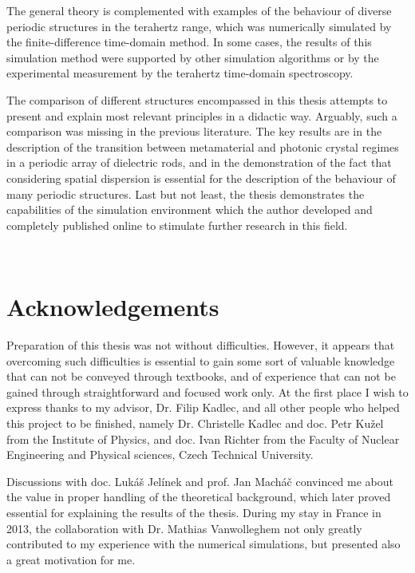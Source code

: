 The general theory is complemented with examples of the behaviour of diverse periodic structures in the terahertz range, which was numerically simulated by the finite-difference time-domain method. In some cases, the results of this simulation method were supported by other simulation algorithms or by the experimental measurement by the terahertz time-domain spectroscopy. 

The comparison of different structures encompassed in this thesis attempts to present and explain most relevant principles in a didactic way. Arguably, such a comparison was missing in the previous literature.
The key results are in the description of the transition between metamaterial and photonic crystal regimes in a periodic array of dielectric rods, and in the demonstration of the fact that considering spatial dispersion is essential for the description of the behaviour of many periodic structures.
Last but not least, the thesis demonstrates the capabilities of the simulation environment which the author developed and completely published online to stimulate further research in this field. 



\thispagestyle{empty} \newpage ~ \thispagestyle{empty} \newpage \setcounter{page}{1}

{\let\clearpage\relax\chapter*{Acknowledgements}}
Preparation of this thesis was not without difficulties. However, it appears that overcoming such difficulties is essential to gain some sort of valuable knowledge that can not be conveyed through textbooks, and of experience that can not be gained through straightforward and focused work only.  At the first place I wish to express thanks to my advisor, Dr. Filip Kadlec, and all other people who helped this project to be finished, namely Dr. Christelle Kadlec and doc. Petr Ku\v{z}el  from the Institute of Physics, and doc. Ivan Richter from the Faculty of Nuclear Engineering and Physical sciences, Czech Technical University. 

Discussions with doc. Lukáš Jelínek and prof. Jan Macháč convinced me about the value in proper handling of the theoretical background, which later proved essential for explaining the results of the thesis. During my stay in France in 2013, the collaboration with Dr. Mathias Vanwolleghem not only greatly contributed to my experience with the numerical simulations, but presented also a great motivation for me. 

